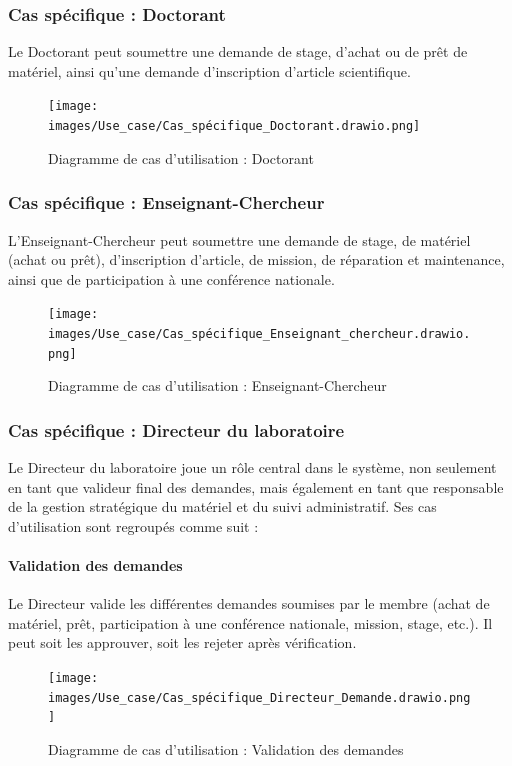 \subsubsection{Cas spécifique : Doctorant}
 Le Doctorant peut soumettre une demande de stage, d’achat ou de prêt de matériel, ainsi qu’une demande d’inscription d’article scientifique.


\begin{figure}[H]
  \centering
  \texttt{[image: images/Use\_case/Cas\_spécifique\_Doctorant.drawio.png]}
      \caption{Diagramme de cas d'utilisation : Doctorant}
\end{figure}

\subsubsection{Cas spécifique : Enseignant-Chercheur}
L’Enseignant-Chercheur peut soumettre une demande de stage, de matériel (achat ou prêt), d’inscription d’article, de mission, de réparation et maintenance, ainsi que de participation à une conférence nationale.

\begin{figure}[H]
  \centering
  \texttt{[image: images/Use\_case/Cas\_spécifique\_Enseignant\_chercheur.drawio.png]}
  \caption{Diagramme de cas d'utilisation : Enseignant-Chercheur}
\end{figure}

\subsubsection{Cas spécifique : Directeur du laboratoire}

Le Directeur du laboratoire joue un rôle central dans le système, non seulement en tant que valideur final des demandes, mais également en tant que responsable de la gestion stratégique du matériel et du suivi administratif. Ses cas d'utilisation sont regroupés comme suit :

\paragraph{Validation des demandes}

Le Directeur valide les différentes demandes soumises par le membre (achat de matériel, prêt, participation à une conférence nationale, mission, stage, etc.). Il peut soit les approuver, soit les rejeter après vérification.

\begin{figure}[H]
  \centering
  \texttt{[image: images/Use\_case/Cas\_spécifique\_Directeur\_Demande.drawio.png]}
  \caption{Diagramme de cas d'utilisation : Validation des demandes}
\end{figure}



